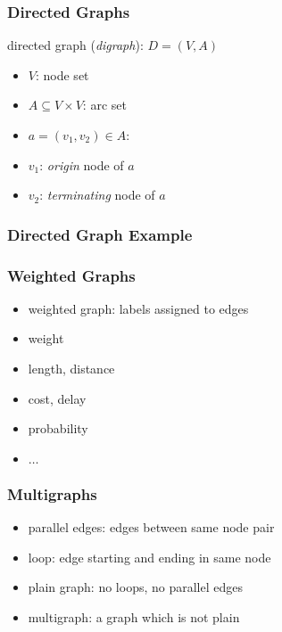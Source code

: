 \documentclass[dvipsnames]{beamer}
\begin{document}
\begin{frame}
  \frametitle{Directed Graphs}

  \begin{definition}
    \alert{directed graph} (\emph{digraph}): $D=(V,A)$

    \begin{itemize}
      \item $V$: node set
      \item $A \subseteq V \times V$: \alert{arc} set
    \end{itemize}
  \end{definition}

  \begin{itemize}
    \item $a=(v_1,v_2) \in A$:
    \smallskip
    \item $v_1$: \emph{origin} node of $a$
    \item $v_2$: \emph{terminating} node of $a$
  \end{itemize}
\end{frame}

\begin{frame}
  \frametitle{Directed Graph Example}

  \begin{center}
  \end{center}
\end{frame}

\begin{frame}
  \frametitle{Weighted Graphs}

  \begin{itemize}
    \item weighted graph: labels assigned to edges

    \medskip
    \item weight
    \item length, distance
    \item cost, delay
    \item probability
    \item $\ldots$
  \end{itemize}

\end{frame}

\begin{frame}
  \frametitle{Multigraphs}

  \begin{itemize}
    \item \alert{parallel edges}: edges between same node pair
    \item \alert{loop}: edge starting and ending in same node

    \bigskip
    \item \alert{plain} graph: no loops, no parallel edges
    \item \alert{multigraph}: a graph which is not plain
  \end{itemize}
\end{frame}
\end{document}
